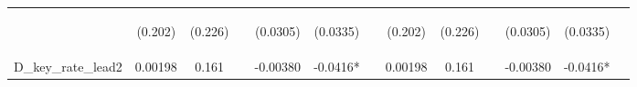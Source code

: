 \documentclass[]{article}
\begin{document}
\begin{center}
\begin{tabular}{lcccccccccccc}
\vspace{4pt} & \begin{footnotesize}(0.202)\end{footnotesize} & \begin{footnotesize}(0.226)\end{footnotesize} & \begin{footnotesize}\end{footnotesize} & \begin{footnotesize}(0.0305)\end{footnotesize} & \begin{footnotesize}(0.0335)\end{footnotesize} & \begin{footnotesize}\end{footnotesize} & \begin{footnotesize}(0.202)\end{footnotesize} & \begin{footnotesize}(0.226)\end{footnotesize} & \begin{footnotesize}\end{footnotesize} & \begin{footnotesize}(0.0305)\end{footnotesize} & \begin{footnotesize}(0.0335)\end{footnotesize} & \begin{footnotesize}\end{footnotesize} \\
D\_key\_rate\_lead2 & 0.00198 & 0.161 &  & -0.00380 & -0.0416* &  & 0.00198 & 0.161 &  & -0.00380 & -0.0416* &  \\

\end{tabular}
\end{center}
\end{document}
